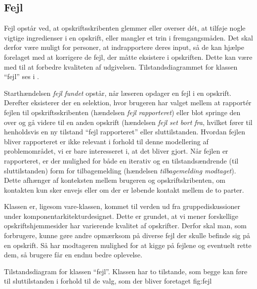 \subsection{Fejl}
Fejl opstår ved, at opskriftsskribenten glemmer eller overser d\'{e}t, at tilføje nogle vigtige ingredienser i en opskrift, eller \fx mangler et trin i fremgangsmåden. Det skal derfor være muligt for personer, at indrapportere deres input, så de kan hjælpe forelaget med at korrigere de fejl, der måtte eksistere i opskriften. Dette kan være med til at forbedre kvaliteten af udgivelsen. Tilstandsdiagrammet for klassen ``fejl'' ses i .

Starthændelsen \textit{fejl fundet} opstår, når læseren opdager en fejl i en opskrift. Derefter eksisterer der en selektion, hvor brugeren har valget mellem at rapport\'{e}r fejlen til opskriftsskribenten (hændelsen \textit{fejl rapporteret}) eller blot springe den over og gå videre til en anden opskrift (hændelsen \textit{fejl set bort fra}, hvilket fører til henholdsvis en ny tilstand ``fejl rapporteret'' eller sluttilstanden. Hvordan fejlen bliver rapporteret er ikke relevant i forhold til denne modellering af problemområdet, vi er bare interesseret i, at det bliver gjort. Når fejlen er rapporteret, er der mulighed for både en iterativ og en tilstandsændrende (til sluttilstanden) form for tilbagemelding (hændelsen \textit{tilbagemelding modtaget}). Dette afhænger af konteksten mellem brugeren og opskriftskribenten, om kontakten kun sker envejs eller om der er løbende kontakt mellem de to parter.

Klassen er, ligesom vare-klassen, kommet til verden ud fra gruppediskussioner under komponentarkitekturdesignet. Dette er grundet, at vi mener forskellige opskriftshjemmesider har varierende kvalitet af opskrifter. Derfor skal man, som forbrugere, kunne gøre andre opmærksom på diverse fejl der skulle befinde sig på en opskrift. Så har modtageren mulighed for at kigge på fejlene og eventuelt rette dem, så brugere får en endnu bedre oplevelse.

{Tilstandsdiagram for klassen ``fejl''. Klassen har to tilstande, som begge kan føre til sluttilstanden i forhold til de valg, som der bliver foretaget}
  {fig:fejl}



